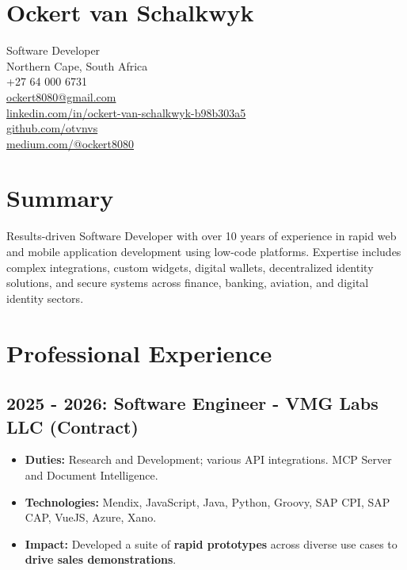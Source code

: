 \documentclass[a4paper,10pt]{article}
\begin{document}
\section{Ockert van Schalkwyk}
Software Developer \\
Northern Cape, South Africa \\
+27 64 000 6731 \\
\href{mailto:ockert8080@gmail.com}{ockert8080@gmail.com} \\
\href{https://www.linkedin.com/in/ockert-van-schalkwyk-b98b303a5/}{linkedin.com/in/ockert-van-schalkwyk-b98b303a5} \\
\href{https://github.com/otvnvs}{github.com/otvnvs} \\
\href{https://medium.com/@ockert8080}{medium.com/@ockert8080}

\section{Summary}

Results-driven Software Developer with over 10 years of experience in rapid web and mobile application development using low-code platforms. Expertise includes complex integrations, custom widgets, digital wallets, decentralized identity solutions, and secure systems across finance, banking, aviation, and digital identity sectors.

\section{Professional Experience}

\subsection{2025 - 2026: Software Engineer - VMG Labs LLC (Contract)}
\begin{itemize}[leftmargin=*, noitemsep]
    \item \textbf{Duties:} Research and Development; various API integrations. MCP Server and Document Intelligence.
    \item \textbf{Technologies:} Mendix, JavaScript, Java, Python, Groovy, SAP CPI, SAP CAP, VueJS, Azure, Xano.
    \item \textbf{Impact:} Developed a suite of \textbf{rapid prototypes} across diverse use cases to \textbf{drive sales demonstrations}.
\end{itemize}
\end{document}
